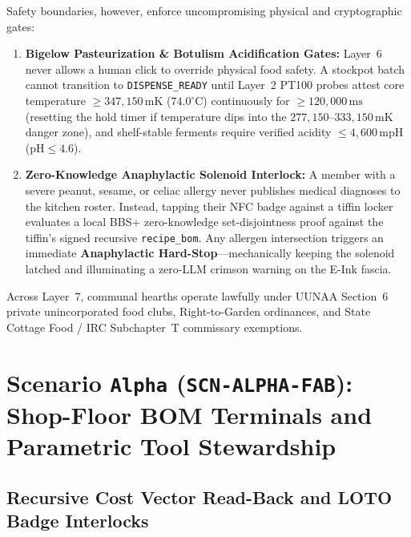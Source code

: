 Safety boundaries, however, enforce uncompromising physical and cryptographic gates:
\begin{enumerate}
    \item \textbf{Bigelow Pasteurization \& Botulism Acidification Gates:} Layer~6 never allows a human click to override physical food safety. A stockpot batch cannot transition to \texttt{DISPENSE\_READY} until Layer~2 PT100 probes attest core temperature $\ge 347{,}150\,\mathrm{mK}$ ($74.0^\circ\mathrm{C}$) continuously for $\ge 120{,}000\,\mathrm{ms}$ (resetting the hold timer if temperature dips into the $277{,}150\text{--}333{,}150\,\mathrm{mK}$ danger zone), and shelf-stable ferments require verified acidity $\le 4{,}600\,\mathrm{mpH}$ ($\mathrm{pH} \le 4.6$).
    \item \textbf{Zero-Knowledge Anaphylactic Solenoid Interlock:} A member with a severe peanut, sesame, or celiac allergy never publishes medical diagnoses to the kitchen roster. Instead, tapping their NFC badge against a tiffin locker evaluates a local BBS+ zero-knowledge set-disjointness proof \parencite{camenisch2004signature} against the tiffin's signed recursive \texttt{recipe\_bom}. Any allergen intersection triggers an immediate \textbf{Anaphylactic Hard-Stop}---mechanically keeping the solenoid latched and illuminating a zero-LLM crimson warning on the E-Ink fascia.
\end{enumerate}
Across Layer~7, communal hearths operate lawfully under UUNAA Section~6 private unincorporated food clubs, Right-to-Garden ordinances, and State Cottage Food / IRC Subchapter~T commissary exemptions.

\section{Scenario \texttt{Alpha} (\texttt{SCN-ALPHA-FAB}): Shop-Floor BOM Terminals and Parametric Tool Stewardship}
\label{sec:wave-b-alpha}

\subsection{Recursive Cost Vector Read-Back and LOTO Badge Interlocks}

